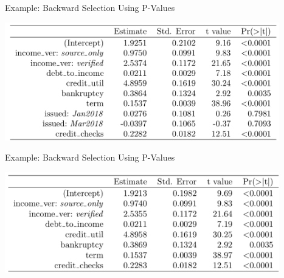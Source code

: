 \begin{frame}{Example: Backward Selection Using P-Values}
    \begin{center}
        \includegraphics[width=4.7in]{images/fullmodel.png}
    \end{center}
\end{frame}

\begin{frame}{Example: Backward Selection Using P-Values}
    \begin{center}
        \includegraphics[width=4.7in]{images/finalmodel.png}
    \end{center}
\end{frame}
